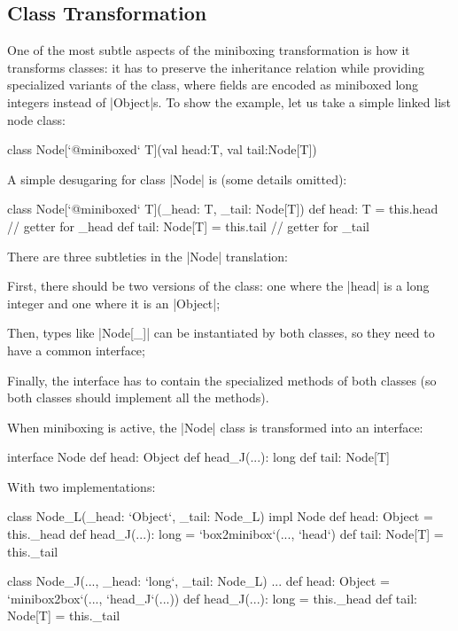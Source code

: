 \subsection{Class Transformation}

One of the most subtle aspects of the miniboxing transformation is how it transforms classes: it has to preserve the inheritance relation while providing specialized variants of the class, where fields are encoded as miniboxed long integers instead of |Object|s. To show the example, let us take a simple linked list node class:

\begin{lstlisting-nobreak}
 class Node[`@miniboxed` T](val head:T, val tail:Node[T])
\end{lstlisting-nobreak}

A simple desugaring for class |Node| is (some details omitted):

\begin{lstlisting-nobreak}
 class Node[`@miniboxed` T](_head: T, _tail: Node[T]) {
   def head: T = this.head                 // getter for _head
   def tail: Node[T] = this.tail // getter for _tail
 }
\end{lstlisting-nobreak}

There are three subtleties in the |Node| translation:
\begin{compactitem}
  \item First, there should be two versions of the class: one where the |head| is a long integer and one where it is an |Object|;
  \item Then, types like |Node[_]| can be instantiated by both classes, so they need to have a common interface;
  \item Finally, the interface has to contain the specialized methods of both classes (so both classes should implement all the methods).
\end{compactitem}

When miniboxing is active, the |Node| class is transformed into an interface:

\begin{lstlisting-nobreak}
 interface Node {
   def head: Object
   def head_J(...): long
   def tail: Node[T]
 }
\end{lstlisting-nobreak}

With two implementations:

\begin{lstlisting-nobreak}
 class Node_L(_head: `Object`, _tail: Node_L) impl Node {
   def head: Object = this._head
   def head_J(...): long = `box2minibox`(..., `head`)
   def tail: Node[T] = this._tail
 }

 class Node_J(..., _head: `long`, _tail: Node_L) ... {
   def head: Object = `minibox2box`(..., `head_J`(...))
   def head_J(...): long = this._head
   def tail: Node[T] = this._tail
 }
\end{lstlisting-nobreak}

